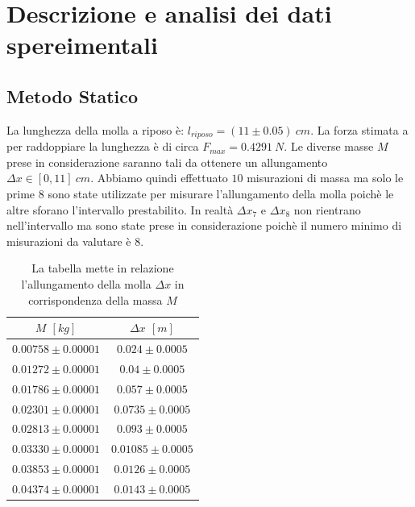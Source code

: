 \documentclass[11pt]{article}
\begin{document}
\section{Descrizione e analisi dei dati spereimentali}
\subsection{Metodo Statico}

La lunghezza della molla a riposo è: $l_{riposo}= (11\pm 0.05)\ cm$. La forza stimata a per raddoppiare la lunghezza è di circa $F_{max}= 0.4291\ N$. Le diverse masse $M$ prese in considerazione saranno tali da ottenere un allungamento $\Delta x \in[0, 11]\ cm$. Abbiamo quindi effettuato $10$ misurazioni di massa ma solo le prime $8$ sono state utilizzate per misurare l'allungamento della molla poichè le altre sforano l'intervallo prestabilito. In realtà $\Delta x_7$ e $\Delta x_8$ non rientrano nell'intervallo ma sono state prese in considerazione poichè il numero minimo di misurazioni da valutare è $8$.
\begin{table}[H]
\centering
\begin{tabular}{|c|c|}
\hline
\textbf{$M$ $[kg]$} & \textbf{$\Delta x$ $[m]$} \\
\hline
$0.00758\pm 0.00001$ & $0.024\pm 0.0005$ \\
$0.01272\pm 0.00001$ & $0.04\pm 0.0005$ \\
$0.01786\pm 0.00001$ & $0.057\pm 0.0005$ \\
$0.02301\pm 0.00001$ & $0.0735\pm 0.0005$ \\
$0.02813\pm 0.00001$ & $0.093\pm 0.0005$ \\
$0.03330\pm 0.00001$ & $0.01085\pm 0.0005$ \\
$0.03853\pm 0.00001$ & $0.0126\pm 0.0005$ \\
$0.04374\pm 0.00001$ & $0.0143\pm 0.0005$ \\
\hline
\end{tabular}
\caption{La tabella mette in relazione l'allungamento della molla $\Delta x$ in corrispondenza della massa $M$}
\label{tab:}
\end{table}
\end{document}
